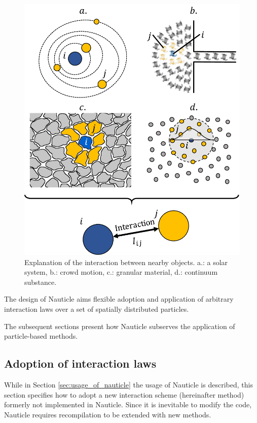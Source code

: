 \documentclass[a4paper,12pt,openany]{book}
\theoremstyle{break}
\begin{document}
\begin{figure}[H]
  \includegraphics[scale=0.7]{interaction_explain.pdf}
  \centering
  \caption{Explanation of the interaction between nearby objects. a.: a solar system, b.: crowd motion, c.: granular material, d.: continuum substance.}
  \label{fig:interaction_explain}
\end{figure}
The design of Nauticle aims flexible adoption and application of arbitrary interaction laws over a set of spatially distributed particles.


The subsequent sections present how Nauticle subserves the application of particle-based methods.

\subsection{Adoption of interaction laws}
While in Section \ref{sec:usage_of_nauticle} the usage of Nauticle is described, this section specifies how to adopt a new interaction scheme (hereinafter method) formerly not implemented in Nauticle. Since it is inevitable to modify the code, Nauticle requires recompilation to be extended with new methods.
\end{document}

